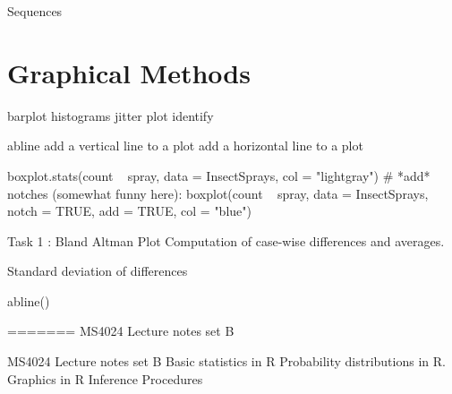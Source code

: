 Sequences 
 



\section{Graphical Methods}

barplot
histograms
jitter
plot
identify

abline
add a vertical line to a plot
add a horizontal line to a plot
 
boxplot.stats(count ~ spray, data = InsectSprays, col = "lightgray")
# *add* notches (somewhat funny here):
boxplot(count ~ spray, data = InsectSprays,        notch = TRUE, add = TRUE, col = "blue")



 
Task 1 : Bland Altman Plot
Computation of case-wise differences and averages.
 
Standard deviation of differences
 
abline()
 
 

 
=======
MS4024 Lecture notes set B

MS4024 Lecture notes set B
Basic statistics in R
Probability distributions in R.
Graphics in R
Inference Procedures
 
